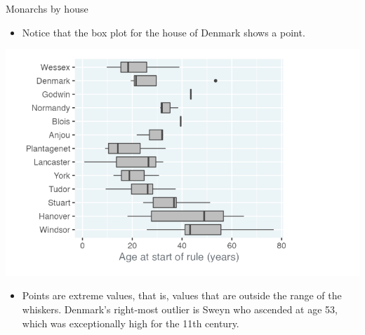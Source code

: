 \documentclass[
  ignorenonframetext,
]{beamer}
\providecommand{\tightlist}{%
  \setlength{\itemsep}{0pt}\setlength{\parskip}{0pt}}
\begin{document}
\begin{frame}{Monarchs by house}
\label{monarchs-by-house-3}
\begin{itemize}
\tightlist
\item
  Notice that the box plot for the house of Denmark shows a point.
\end{itemize}

\includegraphics{../images/im28.png}

\begin{itemize}
\tightlist
\item
  Points are extreme values, that is, values that are outside the range
  of the whiskers. Denmark's right-most outlier is Sweyn who ascended at
  age 53, which was exceptionally high for the 11th century.
\end{itemize}
\end{frame}
\end{document}
